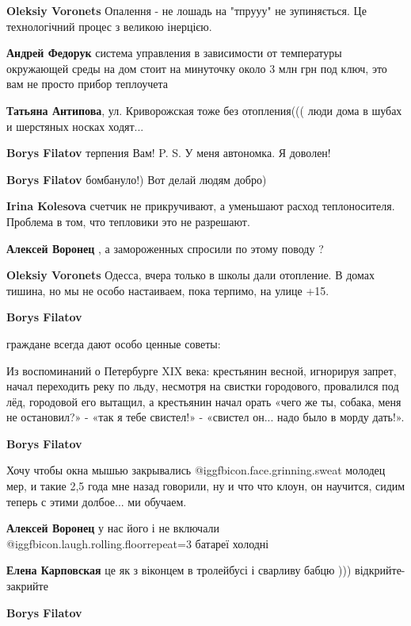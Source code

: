 \begin{itemize}
\begin{itemize}
\textbf{Oleksiy Voronets} Опалення - не лошадь на "тпрууу" не зупиняється. Це технологічний процес з великою інерцією.

\textbf{Андрей Федорук} система управления в зависимости от температуры
окружающей среды на дом стоит на минуточку около 3 млн грн под ключ, это вам не
просто прибор теплоучета

\textbf{Татьяна Антипова}, ул. Криворожская тоже без отопления((( люди дома в шубах и шерстяных носках ходят...

\textbf{Borys Filatov} терпения Вам!
P. S. У меня автономка. Я доволен!

\textbf{Borys Filatov} бомбануло!) Вот делай людям добро)

\textbf{Irina Kolesova} счетчик не прикручивают, а уменьшают расход теплоносителя. Проблема в том, что тепловики это не разрешают.

\textbf{Алексей Воронец} , а замороженных спросили по этому поводу ?

\textbf{Oleksiy Voronets} Одесса, вчера только в школы дали отопление. В домах тишина, но мы не особо настаиваем, пока терпимо, на улице +15.

\textbf{Borys Filatov} 

граждане всегда дают особо ценные советы:

Из воспоминаний о Петербурге XIX века: крестьянин весной, игнорируя запрет,
начал переходить реку по льду, несмотря на свистки городового, провалился под
лёд, городовой его вытащил, а крестьянин начал орать «чего же ты, собака, меня
не остановил?» - «так я тебе свистел!» - «свистел он... надо было в морду
дать!».

\textbf{Borys Filatov} 

Хочу чтобы окна мышью закрывались @igg{fbicon.face.grinning.sweat} молодец мер,
и такие 2,5 года мне назад говорили, ну и что что клоун, он научится, сидим
теперь с этими долбое... ми обучаем.

\textbf{Алексей Воронец} у нас його і не включали  @igg{fbicon.laugh.rolling.floor}{repeat=3}  батареї холодні

\textbf{Елена Карповская} це як з віконцем в тролейбусі і сварливу бабцю ))) відкрийте-закрийте

\textbf{Borys Filatov} 


\end{itemize}
\end{itemize}
